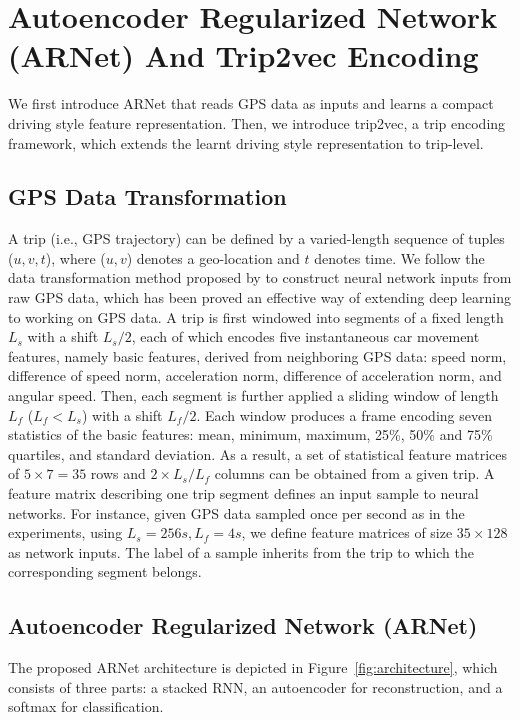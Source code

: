\documentclass{article}
\begin{document}



\section{Autoencoder Regularized Network (ARNet) And Trip2vec Encoding}
We first introduce ARNet that reads GPS data as inputs and learns a compact driving style feature representation. %
Then, we introduce trip2vec, a trip encoding framework, which extends the learnt driving style representation to trip-level.

\subsection{GPS Data Transformation}
A trip (i.e., GPS trajectory) can be defined by a varied-length sequence of tuples ($u, v, t$), where ($u, v$) denotes a geo-location and $t$ denotes time.
We follow the data transformation method proposed by \cite{dong2016characterizing} to construct neural network inputs from raw GPS data, which has been proved an effective way of extending deep learning to working on GPS data.
A trip is first windowed into segments of a fixed length \(L_s\) with a shift $L_s/2$, each of which encodes five instantaneous car movement features, namely basic features, derived from neighboring GPS data: speed norm, difference of speed norm, acceleration norm, difference of acceleration norm, and angular speed.
Then, each segment is further applied a sliding window of length \(L_f\) ($L_f < L_s$) with a shift $L_f/2$. Each window produces a frame encoding seven statistics of the basic features: mean, minimum, maximum, 25\%, 50\% and 75\% quartiles, and standard deviation.
As a result, a set of statistical feature matrices of $5 \times 7=35$ rows and $2\times L_s/L_f$ columns can be obtained from a given trip.
A feature matrix describing one trip segment defines an input sample to neural networks.
For instance, given GPS data sampled once per second as in the experiments, using $L_s=256s,L_f=4s$, we define feature matrices of size $35\times 128$ as network inputs.
The label of a sample inherits from the trip to which the corresponding segment belongs.

\subsection{Autoencoder Regularized Network (ARNet)}
The proposed ARNet architecture is depicted in Figure~\ref{fig:architecture}, which consists of three parts: a stacked RNN, an autoencoder for reconstruction, and a softmax for classification.
\end{document}

